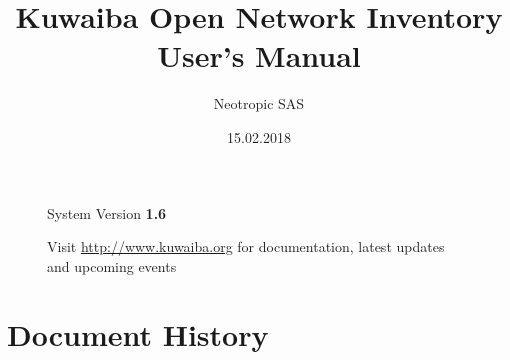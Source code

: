 \documentclass[a4paper]{article}
\title{Kuwaiba Open Network Inventory User's Manual}
\author{Neotropic SAS}
\date{15.02.2018}
\begin{document}
	\maketitle
	
	
	
	\begin{figure}[b]
		\centering System Version \textbf{1.6}
			
		Visit \url{http://www.kuwaiba.org} for documentation, latest updates and upcoming events
	\end{figure}
	
	
	\newpage
	
	\tableofcontents
	
	\clearpage
	\section{Document History}
\end{document}
